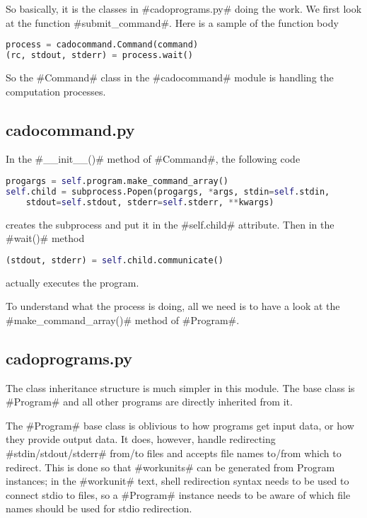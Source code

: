 \documentclass[a4paper]{article}
\begin{document}
So basically, it is the classes in #cadoprograms.py# doing the work.
We first look at the function #submit_command#.
Here is a sample of the function body
\begin{lstlisting}[language=python]
process = cadocommand.Command(command)
(rc, stdout, stderr) = process.wait()
\end{lstlisting}

So the #Command# class in the #cadocommand# module is handling the computation processes.

\subsection{cadocommand.py}

In the #__init__()# method of #Command#, the following code
\begin{lstlisting}[language=python]
progargs = self.program.make_command_array()
self.child = subprocess.Popen(progargs, *args, stdin=self.stdin,
    stdout=self.stdout, stderr=self.stderr, **kwargs)
\end{lstlisting}
creates the subprocess and put it in the #self.child# attribute.
Then in the #wait()# method
\begin{lstlisting}[language=python]
(stdout, stderr) = self.child.communicate()
\end{lstlisting}
actually executes the program.

To understand what the process is doing,
all we need is to have a look at the #make_command_array()# method of #Program#.

\subsection{cadoprograms.py}

The class inheritance structure is much simpler in this module.
The base class is #Program# and all other programs are directly inherited from it.

The #Program# base class is oblivious to how programs get input data,
or how they provide output data.
It does, however, handle redirecting #stdin/stdout/stderr# from/to files and accepts file names to/from which to redirect.
This is done so that #workunits# can be generated from Program instances;
in the #workunit# text, shell redirection syntax needs to be used to connect stdio to files,
so a #Program# instance needs to be aware of which file names should be used for stdio redirection.
\end{document}
